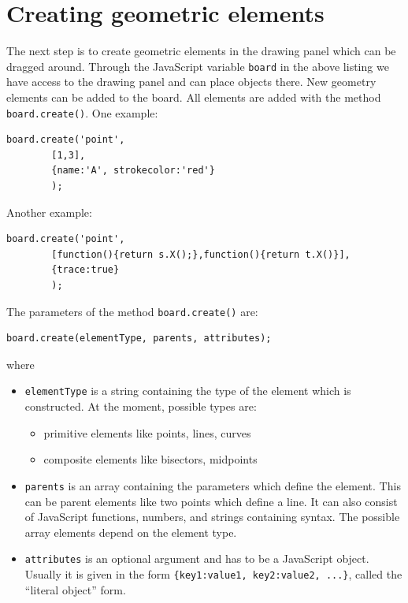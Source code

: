 \chapter{Creating geometric elements}
\label{ch:create}

The next step is to create geometric elements in the drawing panel which can be 
dragged around.
Through the JavaScript variable \lstinline|board| in the above listing we have access to the drawing panel 
and can place objects there. New geometry elements can be added to the board. 
All elements are added with the method \lstinline|board.create()|. One example:
\begin{lstlisting}
board.create('point', 
        [1,3], 
        {name:'A', strokecolor:'red'}
        );
\end{lstlisting}
Another example:
\begin{lstlisting}
board.create('point', 
        [function(){return s.X();},function(){return t.X()}], 
        {trace:true}
        );
\end{lstlisting}
The parameters of the method \lstinline|board.create()| are:
\begin{lstlisting}
board.create(elementType, parents, attributes);
\end{lstlisting}
where
\begin{itemize}
    \item \lstinline|elementType| is a string containing the type of the element which is constructed. 
       At the moment, possible types are:
        \begin{itemize}
          \item primitive elements like points, lines, curves
          \item composite elements like bisectors, midpoints 
        \end{itemize}
    \item \lstinline|parents| is an array containing the parameters which define the element. 
    This can be parent elements like two points which define a line. It can also consist of JavaScript functions, numbers, and strings containing \geonext{} syntax. The possible array elements depend on the element type.
    \item \lstinline|attributes| is an optional argument and has to be a JavaScript object. 
    Usually it is given in the form 
    \lstinline|{key1:value1, key2:value2, ...}|, called the ``literal object'' form.
\end{itemize}

